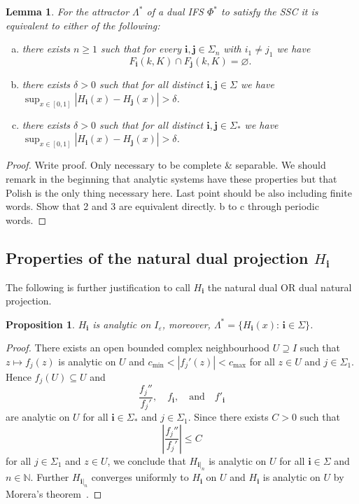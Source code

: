 \documentclass[12pt,]{article}
\newtheorem{proposition}[theorem]{Proposition}
\newtheorem{lemma}[theorem]{Lemma}
\theoremstyle{definition}
\theoremstyle{remark}
\renewcommand{\Bbb}[1]{\mathbb{#1}}
\newcommand{\bbN}{{\Bbb N}}         %
\newcommand{\0}{\mathbf{0}}
\newcommand{\eps}{\varepsilon}
\newcommand{\bi}{\mathbf{i}}
\newcommand{\bj}{\mathbf{j}}
\begin{document}
{\begin{lemma}\label{lem:SSCEequiv}
For the attractor $\Lambda^*$ of a dual IFS $\Phi^*$ to satisfy the SSC it is equivalent to either of the following: 
\begin{enumerate}[a)]
\item there exists $n\geq1$ such that for every $\bi,\bj\in\Sigma_n$  with $i_1\neq j_1$ we have
\begin{equation*}
	F_{\bi}(k,K)\cap F_{\bj}(k,K)=\varnothing. 
\end{equation*}
\item there exists $\delta>0$ such that for all distinct $\bi,\bj \in\Sigma$ we have
  $\sup_{x\in[0,1]} |H_{\bi}(x) - H_{\bj}(x)| > \delta$.
\item there exists $\delta>0$ such that for all distinct $\bi,\bj \in\Sigma_*$ we have
  $\sup_{x\in[0,1]} |H_{\bi}(x) - H_{\bj}(x)| > \delta$.
\end{enumerate}
\end{lemma}
\begin{proof}
  {\color{red}Write proof. Only necessary to be complete \& separable. We should remark in the
  beginning that analytic systems have these properties but that Polish is the only thing necessary
here. Last point should be also including finite words. Show that 2 and 3 are equivalent directly.
b to c through periodic words.}
\end{proof}


\subsection{Properties of the natural dual projection \texorpdfstring{$H_{\bi}$}{H_i}}

The following is further justification to call $H_{\bi}$ the {\color{red}natural dual OR dual natural} projection.
\begin{proposition}\label{thm:H_iAnalytic}
$H_{\bi}$ is analytic on $I_{\eps}$, moreover, $\Lambda^*=\{H_{\bi}(x):\, \bi\in\Sigma\}$.
\end{proposition}
\begin{proof}
There exists an open bounded complex neighbourhood $U \supseteq I$ such that
$z\mapsto f_j(z)$ is analytic on $U$ and $c_{\min}<|f_j'(z)|<c_{\max}$ for all $z\in U$ and $j\in\Sigma_1$.
Hence $f_j(U) \subseteq U$ and
\[
\frac{f_j''}{f_j'},\quad f_{\bi}, \quad\text{and} \quad f'_{\bi}
\]
are analytic on $U$ for all $\bi\in\Sigma_*$ and $j\in\Sigma_1$.
Since there exists $C>0$ such that
\[
\left|\frac{f_j''}{f_j'}\right| \leq C
\]
for all $j\in\Sigma_1$ and $z\in U$, we conclude that $H_{\bi|_n}$ is analytic on $U$ for
all $\bi\in\Sigma$ and $n\in\bbN$. Further $H_{\bi|_n}$ converges uniformly to $H_{\bi}$ on $U$
and $H_{\bi}$ is analytic on $U$ by Morera's theorem~\cite[Theorem 10.17]{Rudin_AnalysisBook}.


\end{proof}}
\end{document}
